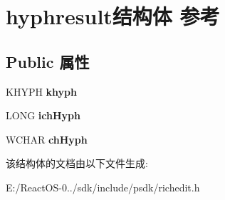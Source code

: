 \hypertarget{structhyphresult}{}\section{hyphresult结构体 参考}
\label{structhyphresult}
\subsection*{Public 属性}
\begin{DoxyCompactItemize}
\item 
\mbox{\label{structhyphresult_a2b0da844e352dbeada0190bd7f2b1be3}} 
K\+H\+Y\+PH {\bfseries khyph}
\item 
\mbox{\label{structhyphresult_ad90cb0157a6a8140cec978ec63a08bab}} 
L\+O\+NG {\bfseries ich\+Hyph}
\item 
\mbox{\label{structhyphresult_a3ded3f5f8f50cdd61c2dc3481de2645e}} 
W\+C\+H\+AR {\bfseries ch\+Hyph}
\end{DoxyCompactItemize}


该结构体的文档由以下文件生成\+:\begin{DoxyCompactItemize}
\item 
E\+:/\+React\+O\+S-\/0../sdk/include/psdk/richedit.\+h\end{DoxyCompactItemize}
